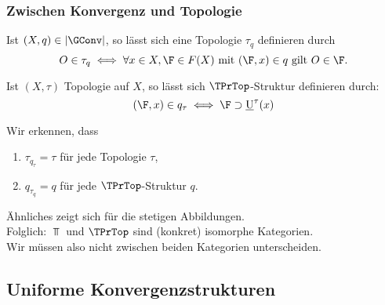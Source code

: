 \begin{frame}
  \frametitle{Zwischen Konvergenz und Topologie}

  Ist $(X,q) \in |\GConv|$, so l\"asst sich eine Topologie $\tau_q$ definieren durch
  $$
  O \in \tau_q \iff \forall x \in X, \F \in F(X) \text{ mit } (\F, x) \in q \text{ gilt } O \in \F.
  $$

  Ist $(X,\tau)$ Topologie auf $X$, so l\"asst sich $\TPrTop$-Struktur definieren durch:
  $$
  (\F, x) \in q_\tau \iff \F \supset \underline{\mathrm{U}}^\tau(x)
  $$

  Wir erkennen, dass
  \begin{enumerate}[(1)]
    \item $\tau_{q_\tau} = \tau$ f\"ur jede Topologie $\tau$,
    \item $q_{\tau_q} = q$ f\"ur jede $\TPrTop$-Struktur $q$.
  \end{enumerate}

  \"Ahnliches zeigt sich f\"ur die stetigen Abbildungen.
  \vspace{1em}\\
  Folglich: $\Top$ und $\TPrTop$ sind (konkret) isomorphe Kategorien.
  \vspace{1em}\\
  Wir m\"ussen also nicht zwischen beiden Kategorien unterscheiden.
\end{frame}

\subsection{Uniforme Konvergenzstrukturen}

